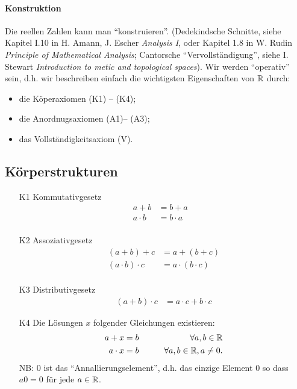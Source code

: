 \paragraph{Konstruktion}
Die reellen Zahlen kann man ``konstruieren''. (Dedekindsche Schnitte, 
siehe Kapitel I.10 in H. Amann, J. Escher {\em Analysis I}, oder
Kapitel 1.8 in W. Rudin {\em Principle of Mathematical Analysis};
Cantorsche ``Vervollst\"andigung'', siehe I. Stewart {\em Introduction to metic
and topological spaces}). 
Wir werden ``operativ'' sein, d.h. wir beschreiben einfach die wichtigsten Eigenschaften von $\mathbb{R}$
durch:
\begin{itemize}
 \item die K\"operaxiomen (K1) -- (K4);
\item die Anordnugsaxiomen (A1)-- (A3);
\item das Vollst\"andigkeitsaxiom (V).
\end{itemize}

\subsection{K\"orperstrukturen}
\begin{itemize}
  \item[K1] Kommutativgesetz
  \begin{align*}
    a+b &= b + a &\\
    a\cdot b &= b\cdot a &\\
  \end{align*}
  \item[K2] Assoziativgesetz
    \begin{align*}
      (a+b)+c &=a+(b+c)\\
      (a\cdot b)\cdot c&=a\cdot(b\cdot c)\\
    \end{align*}
  \item[K3] Distributivgesetz
    \begin{align*}
      (a+b)\cdot c&= a\cdot c + b\cdot c
    \end{align*}
  \item[K4] Die L\"osungen $x$ folgender Gleichungen existieren: 
    \begin{align*}
      a+x&=b &\qquad \forall a,b\in \mathbb{R} \\
      a\cdot x&=b &\qquad \forall a,b\in \mathbb{R}, a\neq 0.\\
    \end{align*}
NB: $0$ ist das ``Annallierungselement'', d.h. das einzige Element $0$ so dass $a 0=0$
f\"ur jede $a\in \mathbb{R}$.
\end{itemize}

